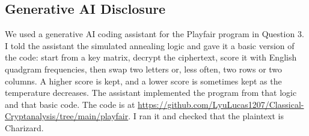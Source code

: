 \documentclass[12pt]{article}
\begin{document}
\begin{samepage}
\section*{Generative AI Disclosure}

We used a generative AI coding assistant for the Playfair program in Question 3. I told the assistant the simulated annealing logic and gave it a basic version of the code: start from a key matrix, decrypt the ciphertext, score it with English quadgram frequencies, then swap two letters or, less often, two rows or two columns. A higher score is kept, and a lower score is sometimes kept as the temperature decreases. The assistant implemented the program from that logic and that basic code. The code is at \href{https://github.com/LyuLucas1207/Classical-Cryptanalysis/tree/main/playfair}{https://github.com/LyuLucas1207/\allowbreak{}Classical-Cryptanalysis/tree/main/playfair}. I ran it and checked that the plaintext is Charizard.
\end{samepage}
\end{document}
